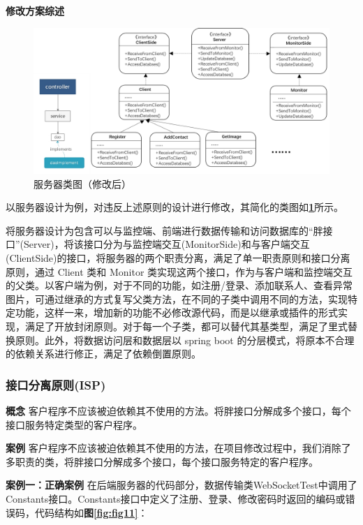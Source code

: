 \documentclass[article]{BJTU-thesis}
\begin{document}
\textbf{修改方案综述}

\begin{figure}[!htbp]
	\centering
	\includegraphics[scale=0.6]{img/23.png}
	\caption{服务器类图（修改后）}\label{fig:fig26}
\end{figure}

以服务器设计为例，对违反上述原则的设计进行修改，其简化的类图如\textbf{\ref{fig:fig26}}所示。

将服务器设计为包含可以与监控端、前端进行数据传输和访问数据库的“胖接口”(Server)，将该接口分为与监控端交互(MonitorSide)和与客户端交互(ClientSide)的接口，将服务器的两个职责分离，满足了单一职责原则和接口分离原则，通过 Client 类和 Monitor 类实现这两个接口，作为与客户端和监控端交互的父类。以客户端为例，对于不同的功能，如注册/登录、添加联系人、查看异常图片，可通过继承的方式复写父类方法，在不同的子类中调用不同的方法，实现特定功能，这样一来，增加新的功能不必修改源代码，而是以继承或插件的形式实现，满足了开放封闭原则。对于每一个子类，都可以替代其基类型，满足了里式替换原则。此外，将数据访问层和数据层以 spring boot 的分层模式，将原本不合理的依赖关系进行修正，满足了依赖倒置原则。

\subsubsection{接口分离原则(ISP)}

\textbf{概念} 客户程序不应该被迫依赖其不使用的方法。将胖接口分解成多个接口，每个接口服务特定类型的客户程序。

\textbf{案例} 客户程序不应该被迫依赖其不使用的方法，在项目修改过程中，我们消除了多职责的类，将胖接口分解成多个接口，每个接口服务特定的客户程序。

\textbf{案例一：正确案例}
在后端服务器的代码部分，数据传输类WebSocketTest中调用了Constants接口。Constants接口中定义了注册、登录、修改密码时返回的编码或错误码，代码结构如\textbf{图\ref{fig:fig11}}：
\end{document}
